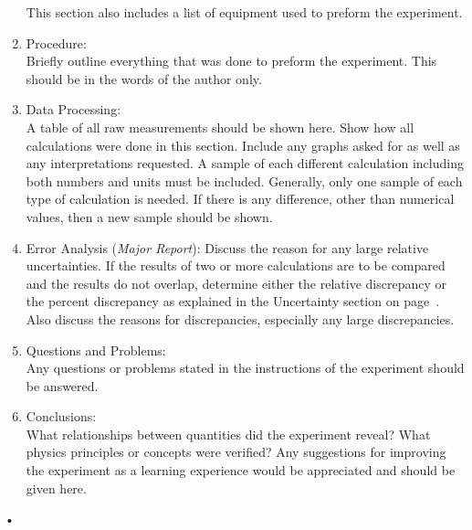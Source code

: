 \documentclass[main.tex]{subfiles}
\begin{document}
\begin{enumerate}
This section also includes a list of equipment used to preform the experiment.
\item
Procedure:\\
Briefly outline everything that was done to preform the experiment. This should be in the words of the author only.
\item
Data Processing:\\
A table of all raw measurements should be shown here. Show how all calculations were done in this section. Include any graphs asked for as well as any interpretations requested. A sample of each different calculation including both numbers and units must be included. Generally, only one sample of each type of calculation is needed. If there is any difference, other than numerical values, then a new sample should be shown.
\item
Error Analysis (\emph{Major Report}):
Discuss the reason for any large relative uncertainties. If the results of two or more calculations are to be compared and the results do not overlap, determine either the relative discrepancy or the percent discrepancy as explained in the Uncertainty section on page~\pageref{sec:Uncertainty}. Also discuss the reasons for discrepancies, especially any large discrepancies.
\item
Questions and Problems:\\
Any questions or problems stated in the instructions of the experiment should be answered.
\item
Conclusions:\\
What relationships between quantities did the experiment reveal? What physics principles or concepts were verified? Any suggestions for improving the experiment as a learning experience would be appreciated and should be given here.
\end{enumerate}•
\end{document}

